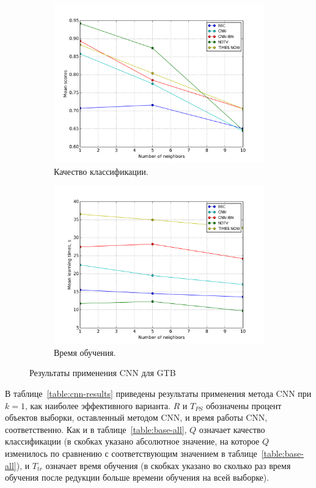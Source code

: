 \begin{figure}
	\centering
	\begin{subfigure}{0.45\textwidth}
		\includegraphics[width=\textwidth]{images/cnn-gradboosting.png}
		\caption{Качество классификации.}
	\end{subfigure}
	\begin{subfigure}{0.45\textwidth}
		\includegraphics[width=\textwidth]{images/cnn-gradboostingTime.png}
		\caption{Время обучения.}
	\end{subfigure}
	\caption{Результаты применения CNN для GTB}\label{fig:cnn-gtb-results}
\end{figure}

В таблице~\ref{table:cnn-results} приведены результаты применения метода CNN при \(k=1\), как наиболее эффективного варианта. \(R\) и \(T_{PS}\) обозначены процент объектов выборки, оставленный методом CNN, и время работы CNN, соответственно. Как и в таблице~\ref{table:base-all}, \(Q\) означает качество классификации (в скобках указано абсолютное значение, на которое \(Q\) изменилось по сравнению с соответствующим значением в таблице~\ref{table:base-all}), и \(T_{tr}\) означает время обучения (в скобках указано во сколько раз время обучения после редукции больше времени обучения на всей выборке).

